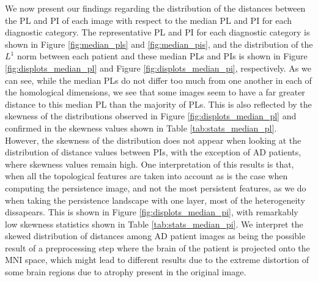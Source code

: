 \documentclass{article}
\begin{document}
We now present our findings regarding the distribution of the distances between the PL and PI of each image with respect to the median PL and PI for each diagnostic category. The representative PL and PI for each diagnostic category is shown in Figure \ref{fig:median_pls} and \ref{fig:median_pis}, and the distribution of the $L^1$ norm between each patient and these median PLs and PIs is shown in Figure \ref{fig:displots_median_pl} and Figure \ref{fig:displots_median_pi}, respectively. As we can see, while the median PLs do not differ too much from one another in each of the homological dimensions, we see that some images seem to have a far greater distance to this median PL than the majority of PLs. This is also reflected by the skewness of the distributions observed in Figure \ref{fig:displots_median_pl} and confirmed in the skewness values shown in Table \ref{tab:stats_median_pl}. However, the skewness of the distribution does not appear when looking at the distribution of distance values between PIs, with the exception of AD patients, where skewness values remain high. One interpretation of this results is that, when all the topological features are taken into account as is the case when computing the persistence image, and not the most persistent features, as we do when taking the persistence landscape with one layer, most of the heterogeneity dissapears. This is shown in Figure \ref{fig:displots_median_pi}, with remarkably low skewness statistics shown in Table \ref{tab:stats_median_pi}. We interpret the skewed distribution of distances among AD patient images as being the possible result of a preprocessing step where the brain of the patient is projected onto the MNI space, which might lead to different results due to the extreme distortion of some brain regions due to atrophy present in the original image.
\end{document}
